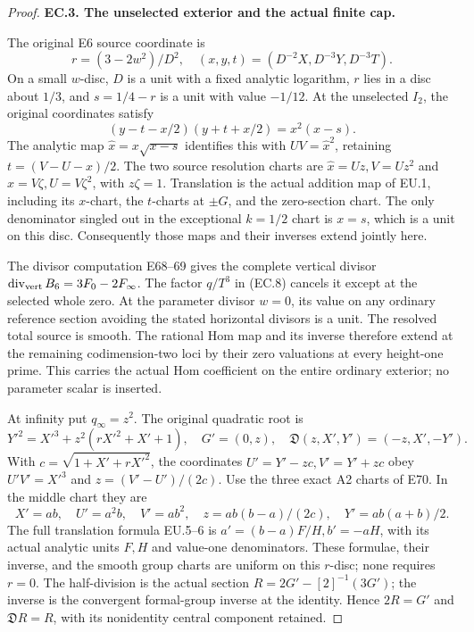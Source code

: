 \begin{proof}
\par\medskip\noindent\textbf{EC.3. The unselected exterior and the actual finite cap.}\par\nopagebreak[4]

The original E6 source coordinate is
\[
 r=(3-2w^2)/D^2,\quad (x,y,t)=(D^{-2}X,D^{-3}Y,D^{-3}T).
 \tag{EC.15}
\]
On a small \(w\)-disc, \(D\) is a unit with a fixed analytic
logarithm, \(r\) lies in a disc about \(1/3\), and
\(s=1/4-r\) is a unit with value \(-1/12\). At the unselected
\(I_2\), the original coordinates satisfy
\[
 (y-t-x/2)(y+t+x/2)=x^2(x-s).
\]
The analytic map \(\widehat x=x\sqrt{x-s}\) identifies this with
\(UV=\widehat x^2\), retaining
\(t=(V-U-x)/2\). The two source resolution charts are
\(\widehat x=Uz,V=Uz^2\) and
\(\widehat x=V\zeta,U=V\zeta^2\), with \(z\zeta=1\).
Translation is the actual addition map of EU.1, including its
\(x\)-chart, the \(t\)-charts at \(\pm G\), and the zero-section
chart. The only denominator singled out in the exceptional
\(k=1/2\) chart is \(x=s\), which is a unit on this disc.
Consequently those maps and their inverses extend jointly here.

The divisor computation E68--69 gives the complete vertical divisor
\(\operatorname{div}_{\rm vert}B_6=3F_0-2F_\infty\).
The factor \(q/T^3\) in (EC.8) cancels it except at the selected
whole zero. At the parameter divisor \(w=0\), its value on any
ordinary reference section avoiding the stated horizontal divisors
is a unit. The resolved total source is smooth. The rational Hom
map and its inverse therefore extend at the remaining
codimension-two loci by their zero valuations at every height-one
prime. This carries the actual Hom coefficient on the entire
ordinary exterior; no parameter scalar is inserted.

At infinity put \(q_\infty=z^2\). The original quadratic root is
\[
 Y'^2=X'^3+z^2(rX'^2+X'+1),\quad G'=(0,z),
 \quad\mathfrak D(z,X',Y')=(-z,X',-Y').
 \tag{EC.16}
\]
With \(c=\sqrt{1+X'+rX'^2}\), the coordinates
\(U'=Y'-zc,V'=Y'+zc\) obey \(U'V'=X'^3\) and
\(z=(V'-U')/(2c)\). Use the three exact A2 charts of E70.
In the middle chart they are
\[
 X'=ab,\quad U'=a^2b,\quad V'=ab^2,\quad
 z=ab(b-a)/(2c),\quad Y'=ab(a+b)/2.
 \tag{EC.17}
\]
The full translation formula EU.5--6 is
\(a'=(b-a)F/H,b'=-aH\), with its actual analytic units
\(F,H\) and value-one denominators. These formulae, their inverse,
and the smooth group charts are uniform on this \(r\)-disc; none
requires \(r=0\). The half-division is the actual section
\(R=2G'-[2]^{-1}(3G')\); the inverse is the convergent formal-group
inverse at the identity. Hence \(2R=G'\) and \(\mathfrak D R=R\),
with its nonidentity central component retained.


\end{proof}
